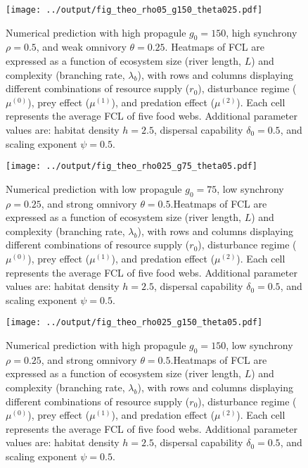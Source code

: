 \newpage

\begin{figure}
\centering
\texttt{[image: ../output/fig\_theo\_rho05\_g150\_theta025.pdf]}
\caption{\label{fig:fig-num4}Numerical prediction with high propagule
\(g_0 = 150\), high synchrony \(\rho = 0.5\), and weak omnivory
\(\theta = 0.25\). Heatmaps of FCL are expressed as a function of
ecosystem size (river length, \(L\)) and complexity (branching rate,
\(\lambda_b\)), with rows and columns displaying different combinations
of resource supply (\(r_0\)), disturbance regime (\(\mu^{(0)}\)), prey
effect (\(\mu^{(1)}\)), and predation effect (\(\mu^{(2)}\)). Each cell
represents the average FCL of five food webs. Additional parameter
values are: habitat density \(h=2.5\), dispersal capability
\(\delta_0=0.5\), and scaling exponent \(\psi=0.5\).}
\end{figure}

\newpage

\begin{figure}
\centering
\texttt{[image: ../output/fig\_theo\_rho025\_g75\_theta05.pdf]}
\caption{\label{fig:fig-num5}Numerical prediction with low propagule
\(g_0 = 75\), low synchrony \(\rho = 0.25\), and strong omnivory
\(\theta = 0.5\).Heatmaps of FCL are expressed as a function of
ecosystem size (river length, \(L\)) and complexity (branching rate,
\(\lambda_b\)), with rows and columns displaying different combinations
of resource supply (\(r_0\)), disturbance regime (\(\mu^{(0)}\)), prey
effect (\(\mu^{(1)}\)), and predation effect (\(\mu^{(2)}\)). Each cell
represents the average FCL of five food webs. Additional parameter
values are: habitat density \(h=2.5\), dispersal capability
\(\delta_0=0.5\), and scaling exponent \(\psi=0.5\).}
\end{figure}

\newpage

\begin{figure}
\centering
\texttt{[image: ../output/fig\_theo\_rho025\_g150\_theta05.pdf]}
\caption{\label{fig:fig-num6}Numerical prediction with high propagule
\(g_0 = 150\), low synchrony \(\rho = 0.25\), and strong omnivory
\(\theta = 0.5\).Heatmaps of FCL are expressed as a function of
ecosystem size (river length, \(L\)) and complexity (branching rate,
\(\lambda_b\)), with rows and columns displaying different combinations
of resource supply (\(r_0\)), disturbance regime (\(\mu^{(0)}\)), prey
effect (\(\mu^{(1)}\)), and predation effect (\(\mu^{(2)}\)). Each cell
represents the average FCL of five food webs. Additional parameter
values are: habitat density \(h=2.5\), dispersal capability
\(\delta_0=0.5\), and scaling exponent \(\psi=0.5\).}
\end{figure}

